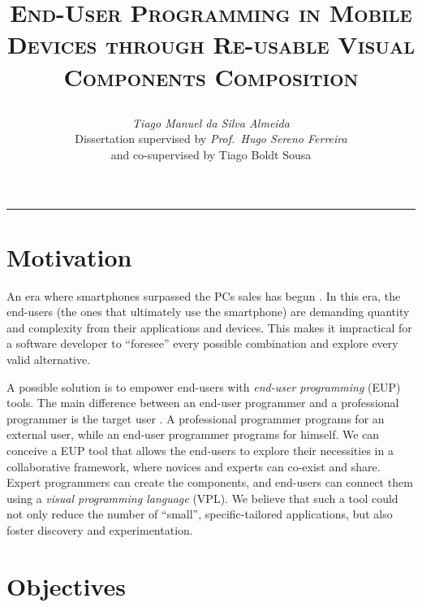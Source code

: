 \documentclass[9pt,a4paper]{extarticle}
\begin{document}
\title{\vspace*{-8mm}\textbf{\textsc{End-User Programming in Mobile Devices
through Re-usable Visual Components Composition}}
\author{\emph{Tiago Manuel da Silva Almeida}\\[2mm]
\small{Dissertation supervised by \emph{Prof.\ Hugo Sereno Ferreira}}\\
\small{and co-supervised by Tiago Boldt Sousa}}}
\date{}
\maketitle
\thispagestyle{empty}

\vspace*{-4mm}\noindent\rule{\textwidth}{0.4pt}\vspace*{4mm}

\begin{multicols}{2}

\section{Motivation}\label{sec:motiva}

An era where smartphones surpassed the PCs sales has begun \cite{more_smartphones}. In this era, the end-users (the ones that ultimately use the smartphone) 
are demanding quantity and complexity from their applications and devices. 
This makes it impractical for a software developer to ``foresee'' every possible combination and explore every valid alternative.

A possible solution is to empower end-users with \emph{end-user programming} (EUP) tools. 
The main difference between an end-user programmer and a professional programmer is the target user \cite{SotaEUE2011}. 
A professional programmer programs for an external user, while an end-user programmer programs for himself.
We can conceive a EUP tool that allows the end-users to explore their necessities in a collaborative framework, where novices and experts can co-exist and share. Expert programmers can
create the components, and end-users can connect them using a \emph{visual programming language} (VPL).
We believe that such a tool could not only reduce the number of ``small'', specific-tailored applications, but also foster discovery and experimentation.

\section{Objectives}\label{sec:goals}


\end{multicols}
\end{document}

